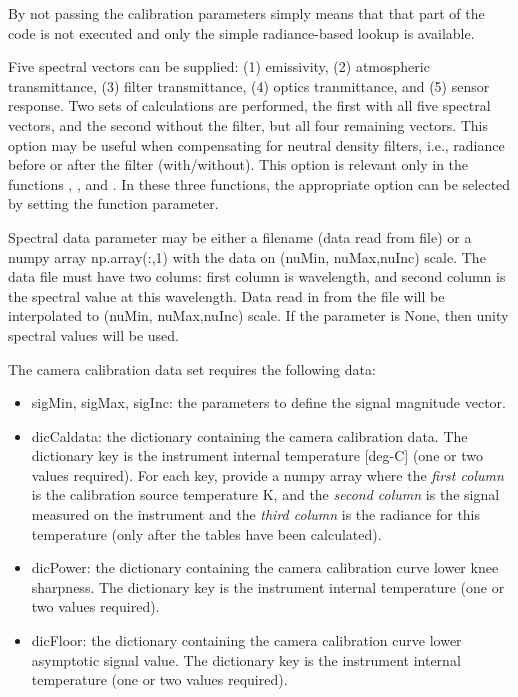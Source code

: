 \documentclass[a4paper,10pt,english]{sphinxmanual}
\begin{document}
\begin{fulllineitems}
\begin{itemize}
\end{itemize}

By not passing the calibration parameters simply means that that part of the code is 
not executed and only the simple radiance-based lookup is available.

Five spectral vectors can be supplied: 
(1) emissivity, 
(2) atmospheric transmittance,
(3) filter transmittance,
(4) optics tranmittance, and
(5) sensor response.
Two sets of calculations are performed, the first with all five spectral vectors,
and the second without the filter, but all four remaining vectors.  This option
may be useful when compensating for neutral density filters, i.e., radiance before
or after the filter (with/without).  This option is relevant only in the 
functions , , and . In these three
functions, the appropriate option can be selected by setting the 
function parameter.

Spectral data parameter may be either a filename (data read from file) or a 
numpy array np.array(:,1) with the data on (nuMin, nuMax,nuInc) scale.  The data file
must have two colums: first column is wavelength, and second
column is the spectral value at this wavelength.  Data read in from the file
will be interpolated to (nuMin, nuMax,nuInc) scale. If the parameter is None, 
then unity spectral values will be used.

The camera calibration data set requires the following data:
\begin{itemize}
\item {} 
sigMin, sigMax, sigInc: the parameters to define the signal magnitude vector.

\item {} 
dicCaldata:  the dictionary containing the camera calibration data.  The dictionary
key is the instrument internal temperature {[}deg-C{]} (one or two values required).  
For each key, provide a numpy array where the \emph{first column} is the calibration 
source temperature K, and the \emph{second column} is the signal measured on 
the instrument and the \emph{third column} is the radiance for this temperature 
(only after the tables have been calculated).

\item {} 
dicPower: the dictionary containing the camera calibration curve lower knee
sharpness.  The dictionary key is the instrument internal temperature 
(one or two values required).

\item {} 
dicFloor: the dictionary containing the camera calibration curve lower asymptotic
signal value.  The dictionary key is the instrument internal temperature 
(one or two values required).


\end{itemize}
\end{fulllineitems}
\end{document}
